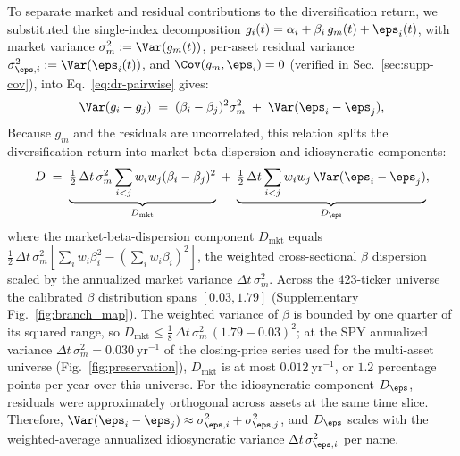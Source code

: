 To separate market and residual contributions to the diversification
return, we substituted the single-index decomposition
$g_i(t) = \alpha_i + \beta_i\, g_m(t) + \eps_i(t)$, with market
variance $\sigma_m^2 := \Var(g_m(t))$, per-asset residual variance
$\sigma_{\eps,i}^2 := \Var(\eps_i(t))$, and
$\Cov(g_m, \eps_i) = 0$ (verified in
Sec.~\ref{sec:supp-cov}), into Eq.~\eqref{eq:dr-pairwise} gives:
\begin{equation}
  \Var(g_i - g_j) \;=\; (\beta_i - \beta_j)^2 \sigma_m^2
  \;+\; \Var(\eps_i - \eps_j),
\end{equation}
Because $g_m$ and the residuals are uncorrelated, this relation splits
the diversification return into market-beta-dispersion and
idiosyncratic components:
\begin{equation}
  D \;=\;
  \underbrace{\tfrac{1}{2}\,\Delta t\,\sigma_m^2 \sum_{i<j} w_i w_j (\beta_i - \beta_j)^2}_{D_{\mathrm{mkt}}}
  \;+\;
  \underbrace{\tfrac{1}{2}\,\Delta t \sum_{i<j} w_i w_j \,\Var(\eps_i - \eps_j)}_{D_\eps},
  \label{eq:dr-sim}
\end{equation}
where the market-beta-dispersion component $D_\mathrm{mkt}$ equals
$\tfrac{1}{2}\,\Delta t\,\sigma_m^2 [\sum_i w_i \beta_i^2 -
(\sum_i w_i \beta_i)^2]$, the weighted cross-sectional $\beta$
dispersion scaled by the annualized market variance
$\Delta t\,\sigma_m^2$. Across the $423$-ticker universe the calibrated
$\beta$ distribution spans $[0.03, 1.79]$ (Supplementary Fig.~\ref{fig:branch_map}).
The weighted variance of $\beta$ is bounded by one quarter of its
squared range, so $D_{\mathrm{mkt}} \le \tfrac{1}{8}\,\Delta t\,
\sigma_m^2\,(1.79 - 0.03)^2$; at the SPY annualized variance
$\Delta t\,\sigma_m^2 = 0.030~\mathrm{yr}^{-1}$ of the closing-price
series used for the multi-asset universe (Fig.~\ref{fig:preservation}),
$D_{\mathrm{mkt}}$ is at most $0.012~\mathrm{yr}^{-1}$, or $1.2$
percentage points per year over this universe. For the idiosyncratic
component $D_\eps$, residuals were approximately orthogonal across
assets at the same time slice. Therefore,
$\Var(\eps_i - \eps_j) \approx \sigma_{\eps,i}^2 + \sigma_{\eps,j}^2$,
and $D_\eps$ scales with the weighted-average annualized idiosyncratic
variance $\Delta t\,\sigma_{\eps,i}^2$ per name.

